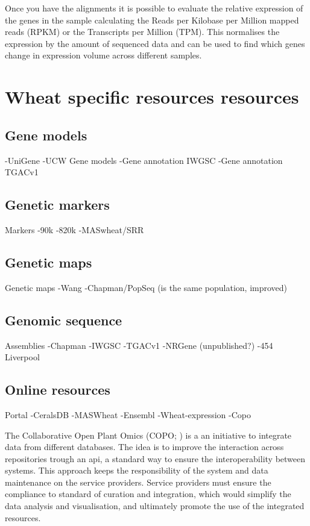 Once you have the alignments it is possible to evaluate the relative expression of the genes in the sample calculating the Reads per Kilobase per Million mapped reads (RPKM) or the Transcripts per Million (TPM). This normalises the expression by the amount of sequenced data and can be used to find which genes change in expression volume across different samples.   


\section{Wheat specific resources resources}
\label{lit:wheatResourcers}


\subsection{Gene models}
-UniGene
-UCW Gene models
-Gene annotation IWGSC
-Gene annotation TGACv1

\subsection{Genetic markers}


Markers
-90k
-820k
-MASwheat/SRR

\subsection{Genetic maps}
Genetic maps
-Wang
-Chapman/PopSeq (is the same population, improved)

\subsection{Genomic sequence}
Assemblies
-Chapman
-IWGSC
-TGACv1
-NRGene (unpublished?)
-454 Liverpool

\subsection{Online resources}
Portal
-CeralsDB
-MASWheat
-Ensembl
-Wheat-expression
-Copo

The Collaborative Open Plant Omics (COPO; \citealt{Davey2015}) is a an initiative to integrate data from different databases. 
The idea is to improve the interaction across repositories trough an \gls{api}, a standard way to ensure the interoperability between systems. 
This approach keeps the responsibility of the system and data maintenance on the service providers. 
Service providers must ensure the compliance to standard of curation and integration, which would simplify the data analysis and visualisation, and ultimately promote the use of the integrated resources.  



